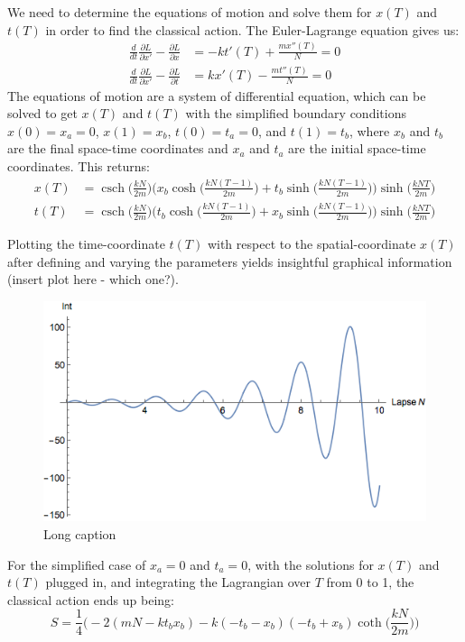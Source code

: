 \documentclass[12pt]{revtex4}
\DeclareMathOperator{\csch}{csch}
\begin{document}
We need to determine the equations of motion and solve them for $x(T)$ and $t(T)$ in order to find the classical action. The Euler-Lagrange equation gives us:
\begin{align*}
\frac{d}{dt}\frac{\partial L}{\partial x'}-\frac{\partial L}{\partial x} &= -k t'(T) + \frac{m x''(T)}{N} =0\\
\frac{d}{dt}\frac{\partial L}{\partial x'}-\frac{\partial L}{\partial t} &= k x'(T) - \frac{m t''(T)}{N} =0
\end{align*}
The equations of motion are a system of differential equation, which can be solved to get $x(T)$ and $t(T)$ with the simplified boundary conditions $x(0) = x_a = 0$, $x(1)=x_b$, $t(0) = t_a = 0$, and $t(1)=t_b$, where $x_b$ and $t_b$ are the final space-time coordinates and $x_a$ and $t_a$ are the initial space-time coordinates. This returns:
\begin{align*}
x(T) &= \csch \bigg(\frac{k N}{2 m}\bigg) \Biggr(x_b \cosh\bigg(\frac{k N (T-1)}{2m}\bigg)+ 
t_b \sinh\bigg(\frac{k N (T-1)}{2m}\bigg)\Biggr) \sinh\bigg(\frac{k N T}{2m}\bigg)\\
t(T)&= \csch \bigg(\frac{k N}{2 m}\bigg) \Biggr(t_b \cosh\bigg(\frac{k N (T-1)}{2m}\bigg)+ 
x_b \sinh\bigg(\frac{k N (T-1)}{2m}\bigg)\Biggr) \sinh\bigg(\frac{k N T}{2m}\bigg)
\end{align*} 

Plotting the time-coordinate $t(T)$ with respect to the spatial-coordinate $x(T)$ after defining and varying the parameters yields insightful graphical information (insert plot here - which one?).

\begin{figure}[h]
	\centering
	\includegraphics[width=0.7\linewidth]{integrandplot}
	\caption{Long caption}
	\label{integrandplot}
\end{figure}


For the simplified case of $x_a=0$ and $t_a=0$, with the solutions for $x(T)$ and $t(T)$ plugged in, and integrating the Lagrangian over $T$ from 0 to 1, the classical action ends up being:
\begin{equation*}
S = \frac{1}{4} \Bigg(-2 (m N - k t_b x_b) - k (-t_b - x_b) (-t_b + x_b) \coth\bigg(\frac{k N}{2 m}\bigg)\Bigg)
\end{equation*} 
\end{document}

